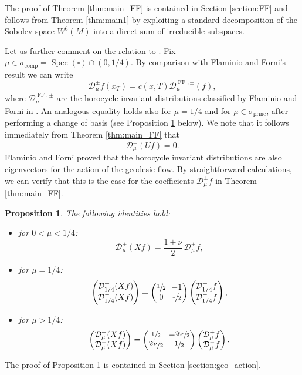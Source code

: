 \documentclass[JEP,XML,SOM,NoEqCountersInSection,Unicode,published]{cedram}
\newcommand{\Dp}[1]{\mathcal{D}_\mu^{+} #1}
\newcommand{\Dm}[1]{\mathcal{D}_\mu^{-} #1}
\newcommand{\Dpm}[1]{\mathcal{D}_\mu^{\pm} #1}
\newcommand{\Dpmp}[1]{\mathcal{D}_\mu^{\pm}(#1)}
\DeclareMathOperator{\Spec}{Spec}
\DeclareMathOperator{\comp}{comp}
\DeclareMathOperator{\princ}{princ}
\DeclareMathOperator{\FF}{FF}
\newtheorem {proposition}[theorem]{Proposition}
\theoremstyle{definition}
\begin{document}
The proof of Theorem \ref{thm:main_FF} is contained in Section \ref{section:FF} and follows from Theorem \ref{thm:main1} by exploiting a standard decomposition of the Sobolev space $W^6(M)$ into a direct sum of irreducible subspaces.

Let us further comment on the relation to \cite[Th.\,1.5]{FlaFo}. Fix $\mu \in \sigma_{\comp} = \Spec(\square) \cap (0,1/4)$.
By comparison with Flaminio and Forni's result we can write
\[
\Dpm{f}(x_T) = c(x,T) \mathcal{D}^{\FF, \pm}_\mu (f),
\]
where $\mathcal{D}^{\FF, \pm}_\mu$ are the horocycle invariant distributions classified by Flaminio and Forni in \cite{FlaFo}.
An analogous equality holds also for $\mu = 1/4$ and for $\mu \in \sigma_{\princ}$, after performing a change of basis (see Proposition \ref{thm:eigenvectors} below). We note that it follows immediately from Theorem \ref{thm:main_FF} that
\[
\Dpmp{Uf} =0.
\]
Flaminio and Forni proved that the horocycle invariant distributions are also eigenvectors for the action of the geodesic flow. By straightforward calculations, we can verify that this is the case for the coefficients $\Dpm{f}$ in Theorem \ref{thm:main_FF}.

\begin{proposition}\label{thm:eigenvectors}
The following identities hold:
\begin{itemize}
\item for $0<\mu< 1/4$:
\[
\Dpmp{Xf} = \frac{1\pm \nu}{2}\, \Dpm{f},
\]
\item for $\mu=1/4$:
\[\arraycolsep3.5pt
\begin{pmatrix}
\mathcal{D}^{+}_{1/4}(Xf) \\
\mathcal{D}^{-}_{1/4}(Xf)
\end{pmatrix}
=
\begin{pmatrix}
\sfrac{1}{2} & -1 \\
0 & \sfrac{1}{2}
\end{pmatrix}
\begin{pmatrix}
\mathcal{D}^{+}_{1/4}f \\
\mathcal{D}^{-}_{1/4}f
\end{pmatrix},
\]
\item for $\mu > 1/4$:
\[\arraycolsep3.5pt
\begin{pmatrix}
\Dp{(Xf)} \\
\Dm{(Xf)}
\end{pmatrix}
=
\begin{pmatrix}
\sfrac{1}{2} & -\sfrac{\Im \nu}{2} \\
\sfrac{\Im \nu}{2} & \sfrac{1}{2}
\end{pmatrix}
\begin{pmatrix}
\Dp{f} \\
\Dm{f}
\end{pmatrix}.
\]
\end{itemize}
\end{proposition}
The proof of Proposition \ref{thm:eigenvectors} is contained in Section \ref{section:geo_action}.
\end{document}
